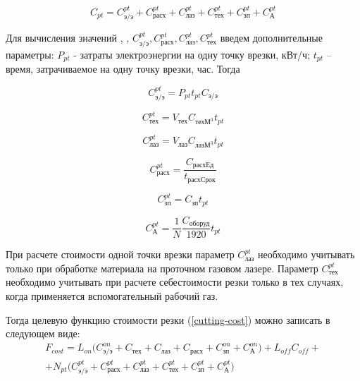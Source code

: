 \documentclass[11pt,twoside]{report}
\begin{document}
\begin{equation}
  C_{pt} =
  C_\text{э/э}^{pt} +
  C_\text{расх}^{pt} +
  C_\text{лаз}^{pt} +
  C_\text{тех}^{pt} +
  C_\text{зп}^{pt} +
  C_\text{А}^{pt}
  \label{c-pt}
\end{equation}

Для вычисления значений  ,  ,
$C_\text{э/э}^{pt}, C_\text{расх}^{pt}, C_\text{лаз}^{pt}, C_\text{тех}^{pt}$
введем дополнительные параметры:
$P_{pt}$ - затраты электроэнергии на одну точку врезки, кВт/ч;
$t_{pt}$ – время, затрачиваемое на одну точку врезки, час. Тогда

\begin{equation}
  C_\text{э/э}^{pt} =
  P_{pt} t_{pt}   C_\text{э/э}
  \label{c-pt-ee}
\end{equation}

\begin{equation}
  C_\text{тех}^{pt} =
  V_\text{тех} C_{\text{техМ}^3} t_{pt}
  \label{c-pt-teh}
\end{equation}

\begin{equation}
  C_\text{лаз}^{pt} =
  V_\text{лаз} C_{\text{лазМ}^3} t_{pt}
  \label{c-pt-laz}
\end{equation}

\begin{equation}
  C_\text{расх}^{pt} =
  \frac{C_\text{расхЕд}}{t_\text{расхСрок}}
  \label{c-pt-rasx}
\end{equation}

\begin{equation}
  C_\text{зп}^{pt} =
  C_\text{зп} t_{pt}
  \label{c-pt-zp}
\end{equation}

\begin{equation}
  C_\text{А}^{pt} =
  \frac{1}N \frac{C_\text{оборуд}}{1920} t_{pt}
  \label{c-pt-A}
\end{equation}

При расчете стоимости одной точки врезки параметр
$C_\text{лаз}^{pt}$
необходимо учитывать только при обработке материала
на проточном газовом лазере.
Параметр
$C_\text{тех}^{pt}$
необходимо учитывать при расчете себестоимости резки только в тех случаях,
когда применяется вспомогательный рабочий газ.

Тогда целевую функцию стоимости резки (\ref{cutting-cost})
можно записать в следующем виде:
\begin{multline}
  F_{cost} =
  L_{on} \Big(
    C_\text{э/э}^{on} +
    C_\text{тех} +
    C_\text{лаз} +
    C_\text{расх} +
    C_\text{зп}^{on} +
    C_\text{А}^{on}
      \Big)
  +L_{off} C_{off} +
  \\
+ N_{pt} \Big(
    C_\text{э/э}^{pt} +
    C_\text{расх}^{pt} +
    C_\text{лаз}^{pt} +
    C_\text{тех}^{pt} +
    C_\text{зп}^{pt} +
    C_\text{А}^{pt}
      \Big)
  \label{c-full}
\end{multline}
\end{document}
